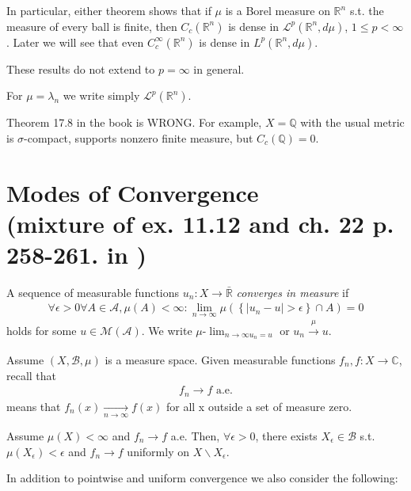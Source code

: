In particular, either theorem shows that if \(\mu\) is a Borel measure on \(\mathbb{R}^n\) s.t. the measure of every ball is finite, then 
\(C_c(\mathbb{R}^n)\) is dense in \(\mathcal{L}^p(\mathbb{R}^n, d\mu)\), \(1\leq p< \infty\). Later we will see that even 
\(C^{\infty}_{c}(\mathbb{R}^n)\) is dense in \(L^p(\mathbb{R}^n, d\mu)\).
\begin{remark}
    These results do not extend to \(p=\infty\) in general. 

    For \(\mu=\lambda_n\) we write simply \(\mathcal{L}^p(\mathbb{R}^n)\).
\end{remark}
\begin{remark}
    Theorem 17.8 in the book is WRONG. For example, \(X=\mathbb{Q}\) with the usual metric is \(\sigma\)-compact, supports nonzero finite measure,
    but \(C_c(\mathbb{Q})=0\).
\end{remark}

\section*{Modes of Convergence \protect\\ \tiny{(mixture of ex. 11.12 and ch. 22 p. 258-261. in \cite{schilling2017measures})}}
\ifdetailed
\begin{definition}
    A sequence of measurable functions \(u_n:X\rightarrow \bar{\mathbb{R}}\) \emph{converges in measure} if
    \begin{align*}
        \forall\epsilon>0\forall A\in\mathscr{A},\mu(A)<\infty:\lim\limits_{n\rightarrow\infty} 
        \mu\left(\left\{\vert u_n - u\vert > \epsilon\right\}\cap A\right) = 0
    \end{align*}
    holds for some \(u\in\mathcal{M}(\mathscr{A})\). We write \(\mu\)-\(\lim_{n\rightarrow\infty u_n = u}\) or 
    \(u_n\xrightarrow[ ]{\mu} u\).
\end{definition}
\fi
Assume \(\left(X,\mathscr{B},\mu\right)\) is a measure space. Given measurable functions \(f_n,f:X\rightarrow\mathbb{C}\), recall that
\begin{align*}
    f_n\rightarrow f \text{ a.e.}
\end{align*}
means that \(f_n(x)\xrightarrow[n\rightarrow\infty]{ } f(x)\) for all x outside a set of measure zero. 
\begin{theorem}[Egorov]
    Assume \(\mu(X)<\infty\) and \(f_n\rightarrow f\) a.e. Then, \(\forall\epsilon>0\), there exists \(X_{\epsilon} \in\mathscr{B}\)
    s.t. \(\mu(X_{\epsilon})<\epsilon\) and \(f_n\rightarrow f\) uniformly on \(X\backslash X_{\epsilon}\).
\end{theorem}
In addition to pointwise and uniform convergence we also consider the following: 

